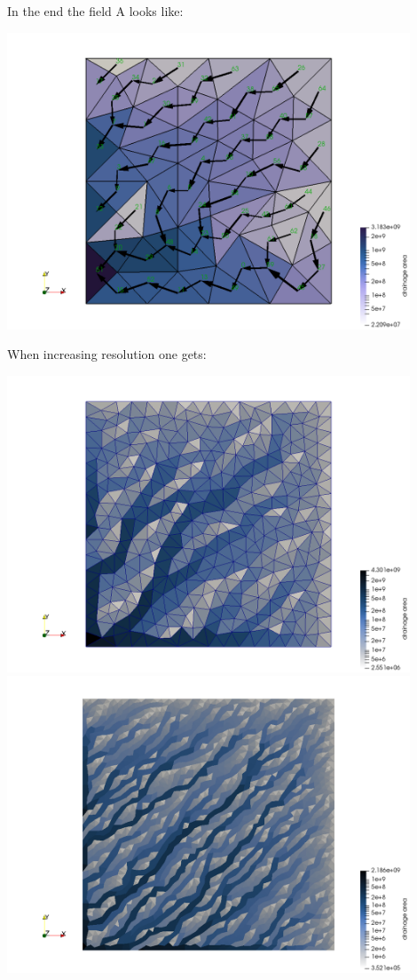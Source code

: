In the end the field A looks like:
\begin{center}
\includegraphics[width=12cm]{python_codes/fieldstone_140/images/mesh8}
\end{center}
When increasing resolution one gets:
\begin{center}
\includegraphics[width=12cm]{python_codes/fieldstone_140/images/mesh10}
\includegraphics[width=12cm]{python_codes/fieldstone_140/images/mesh11}
\end{center}




